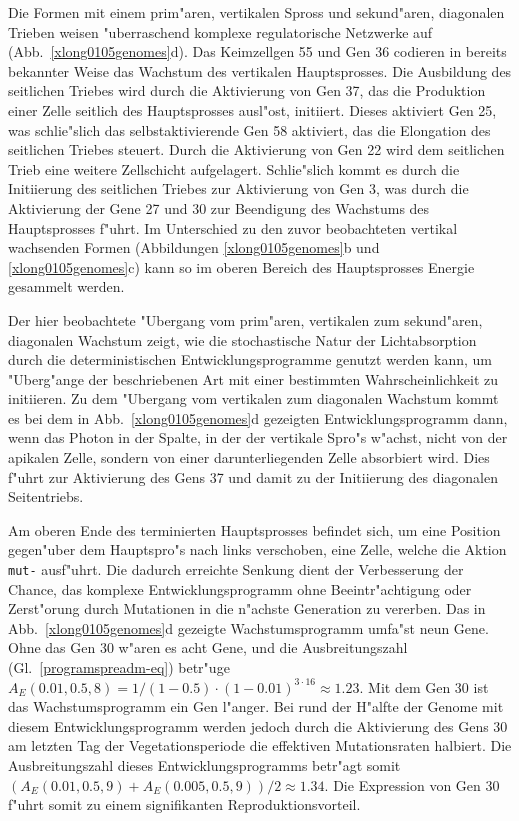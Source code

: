 Die Formen mit einem prim"aren, vertikalen Spross und sekund"aren, diagonalen Trieben weisen "uberraschend
komplexe regulatorische Netzwerke auf (Abb.\ \ref{xlong0105genomes}d). Das Keimzellgen 55 und Gen 36
codieren in bereits bekannter Weise das Wachstum des vertikalen Hauptsprosses. Die Ausbildung des seitlichen
Triebes wird durch die Aktivierung von Gen 37, das die Produktion einer Zelle seitlich des Hauptsprosses
ausl"ost, initiiert. Dieses aktiviert Gen 25, was schlie"slich das selbstaktivierende Gen 58 aktiviert,
das die Elongation des seitlichen Triebes steuert. Durch die Aktivierung von Gen 22 wird dem seitlichen
Trieb eine weitere Zellschicht aufgelagert. Schlie"slich kommt es durch die Initiierung des seitlichen
Triebes zur Aktivierung von Gen 3, was durch die Aktivierung der Gene 27 und 30 zur Beendigung des
Wachstums des Hauptsprosses f"uhrt. Im Unterschied zu den zuvor beobachteten vertikal wachsenden Formen (Abbildungen
\ref{xlong0105genomes}b und \ref{xlong0105genomes}c) kann so im oberen Bereich des Hauptsprosses Energie
gesammelt werden.

Der hier beobachtete "Ubergang vom prim"aren, vertikalen zum sekund"aren, diagonalen Wachstum zeigt,
wie die stochastische Natur der Lichtabsorption durch die deterministischen Entwicklungsprogramme
genutzt werden kann, um "Uberg"ange der beschriebenen Art mit einer bestimmten Wahrscheinlichkeit
zu initiieren. Zu dem "Ubergang vom vertikalen zum diagonalen Wachstum kommt es bei dem in
Abb.\ \ref{xlong0105genomes}d gezeigten Entwicklungsprogramm dann, wenn das Photon in der Spalte,
in der der vertikale Spro"s w"achst, nicht von der apikalen Zelle, sondern von einer darunterliegenden
Zelle absorbiert wird. Dies f"uhrt zur Aktivierung des Gens 37 und damit zu der Initiierung des
diagonalen Seitentriebs.

Am oberen Ende des terminierten Hauptsprosses befindet sich, um
eine Position gegen"uber dem Hauptspro"s nach links verschoben, eine Zelle, welche die Aktion \verb|mut-|
ausf"uhrt. Die dadurch erreichte Senkung dient der Verbesserung der Chance, das komplexe Entwicklungsprogramm
ohne Beeintr"achtigung oder Zerst"orung durch Mutationen in die n"achste Generation zu vererben.
Das in Abb.\ \ref{xlong0105genomes}d gezeigte Wachstumsprogramm umfa"st neun Gene. Ohne das Gen 30 w"aren es acht
Gene, und die Ausbreitungszahl (Gl.\ \ref{programspreadm-eq}) betr"uge
$A_E(0.01, 0.5, 8) = 1/(1-0.5) \cdot (1-0.01)^{3 \cdot 16} \approx 1.23$. Mit dem Gen 30 ist das Wachstumsprogramm ein Gen
l"anger. Bei rund der H"alfte der Genome mit diesem Entwicklungsprogramm werden jedoch durch die Aktivierung des
Gens 30 am letzten Tag der Vegetationsperiode die effektiven Mutationsraten halbiert. Die Ausbreitungszahl
dieses Entwicklungsprogramms betr"agt somit $(A_E(0.01, 0.5, 9) + A_E(0.005, 0.5, 9)) / 2 \approx 1.34$.
Die Expression von Gen 30 f"uhrt somit zu einem signifikanten Reproduktionsvorteil.

